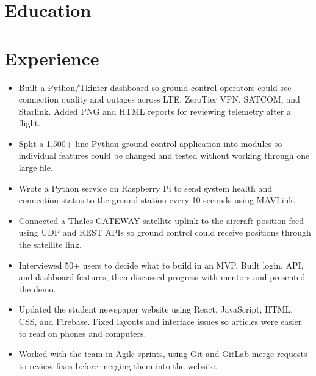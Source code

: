 

\header

\section{Education}

\section{Experience}
\begin{itemize}
  \item Built a Python/Tkinter dashboard so ground control operators could see connection quality and outages across LTE, ZeroTier VPN, SATCOM, and Starlink. Added PNG and HTML reports for reviewing telemetry after a flight.
  \item Split a 1,500+ line Python ground control application into modules so individual features could be changed and tested without working through one large file.
  \item Wrote a Python service on Raspberry Pi to send system health and connection status to the ground station every 10 seconds using MAVLink.
  \item Connected a Thales GATEWAY satellite uplink to the aircraft position feed using UDP and REST APIs so ground control could receive positions through the satellite link.
\end{itemize}
\begin{itemize}
  \item Interviewed 50+ users to decide what to build in an MVP. Built login, API, and dashboard features, then discussed progress with mentors and presented the demo.
\end{itemize}
\begin{itemize}
  \item Updated the student newspaper website using React, JavaScript, HTML, CSS, and Firebase. Fixed layouts and interface issues so articles were easier to read on phones and computers.
  \item Worked with the team in Agile sprints, using Git and GitLab merge requests to review fixes before merging them into the website.
\end{itemize}

